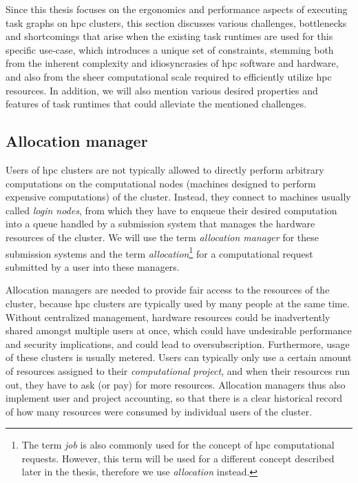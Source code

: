 Since this thesis focuses on the ergonomics and performance aspects of executing task graphs on
\gls{hpc} clusters, this section discusses various challenges, bottlenecks and
shortcomings that arise when the existing task runtimes are used for this specific use-case, which
introduces a unique set of constraints, stemming both from the inherent complexity and
idiosyncrasies of \gls{hpc} software and hardware, and also from the sheer
computational scale required to efficiently utilize \gls{hpc} resources. In
addition, we will also mention various desired properties and features of task runtimes that could
alleviate the mentioned challenges.





\subsection{Allocation manager}
\label{sec:allocation-manager}
Users of \gls{hpc} clusters are not typically allowed to directly perform
arbitrary computations on the computational nodes (machines designed to perform expensive
computations) of the cluster. Instead, they connect to machines usually called
\emph{login nodes}, from which they have to enqueue their desired computation into a queue
handled by a submission system that manages the hardware resources of the cluster. We will use the
term \emph{allocation manager} for these submission systems and the term
\emph{allocation}\footnote{The term \emph{job} is also commonly used for the concept of
\gls{hpc} computational requests. However, this term will be used for a different concept described later in the thesis, therefore we use \emph{allocation} instead.} for a computational request submitted by a
user into these managers.

Allocation managers are needed to provide fair access to the resources of the cluster, because
\gls{hpc} clusters are typically used by many people at the same time. Without
centralized management, hardware resources could be inadvertently shared amongst multiple users at
once, which could have undesirable performance and security implications, and could lead to
oversubscription. Furthermore, usage of these clusters is usually metered. Users can typically only
use a certain amount of resources assigned to their \emph{computational project}, and when their
resources run out, they have to ask (or pay) for more resources. Allocation managers thus also
implement user and project accounting, so that there is a clear historical record of how many
resources were consumed by individual users of the cluster.

